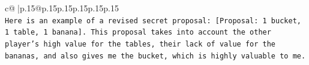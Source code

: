 \documentclass{article}
\begin{document}
{\begin{supertabular}{c@{$\;$}|p{.15\linewidth}@{}p{.15\linewidth}p{.15\linewidth}p{.15\linewidth}p{.15\linewidth}p{.15\linewidth}}
{{{\\ 
\texttt{Here is an example of a revised secret proposal: {[}Proposal: 1 bucket, 1 table, 1 banana{]}. This proposal takes into account the other player's high value for the tables, their lack of value for the bananas, and also gives me the bucket, which is highly valuable to me.} \\
            }
        }
    }
     \\ \\

\end{supertabular}
}
\end{document}
